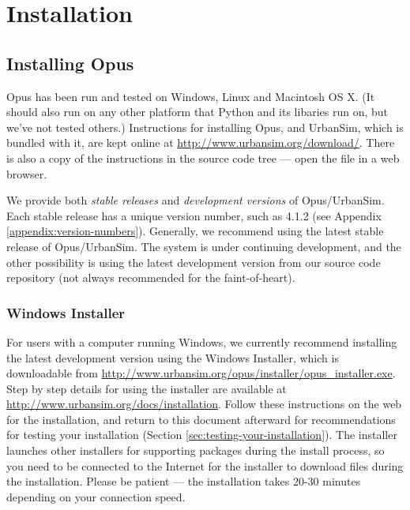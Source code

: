 
\chapter{Installation}
\label{appendix:installation}


\section{Installing Opus}

Opus has been run and tested on Windows, Linux and Macintosh OS X\@.  (It
should also run on any other platform that Python and its libaries run on,
but we've not tested others.)  Instructions for installing Opus, and
UrbanSim, which is bundled with it, are kept online at
\url{http://www.urbansim.org/download/}.  There is also a copy of the
instructions in the source code tree --- open the file 
 in a web browser.

We provide both \emph{stable releases} and \emph{development versions} of
Opus/UrbanSim.  Each stable release has a unique version number, such as
4.1.2 (see Appendix \ref{appendix:version-numbers}).
Generally, we recommend using the latest stable release of
Opus/UrbanSim.  The system is under continuing development, and the other
possibility is using the latest development version from our source code
repository (not always recommended for the faint-of-heart).

\subsection{Windows Installer}

For users with a computer running Windows, we currently recommend
installing the latest development version using the Windows Installer,
which is downloadable from
\url{http://www.urbansim.org/opus/installer/opus_installer.exe}.  Step by
step details for using the installer are available at
\url{http://www.urbansim.org/docs/installation}.  Follow these instructions
on the web for the installation, and return to this document afterward for
recommendations for testing your installation (Section
\ref{sec:testing-your-installation}).  The installer launches other
installers for supporting packages during the install process, so you need
to be connected to the Internet for the installer to download files during
the installation.  Please be patient --- the installation takes 20-30
minutes depending on your connection speed.

